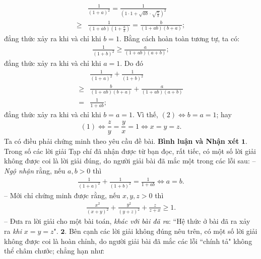 \begin{multicols}{2}
\begin{align*}
		&\frac{1}{{{{\left( {1 + a} \right)}^2}}} = \frac{1}{{{{\left( {1 \cdot 1 + \sqrt {ab}  \cdot \sqrt {\frac{a}{b}} } \right)}^2}}} \\[-0.4ex]
		\ge &\frac{1}{{\left( {1 + ab} \right)\left( {1 + \frac{a}{b}} \right)}}= \frac{b}{{\left( {1 + ab} \right)\left( {b + a} \right)}};
	\end{align*}
	đẳng thức xảy ra khi và chỉ khi $b = 1$.
	\vskip 0.05cm
	Bằng cách hoàn toàn tương tự, ta có:
	\begin{align*}
		\frac{1}{{{{\left( {1 + b} \right)}^2}}} \ge \frac{a}{{\left( {1 + ab} \right)\left( {a + b} \right)}};
	\end{align*}
	đẳng thức xảy ra khi và chỉ khi $a = 1$.
	\vskip 0.05cm
	Do đó
	\begin{align*}
		&\frac{1}{{{{\left( {1 + a} \right)}^2}}} + \frac{1}{{{{\left( {1 + b} \right)}^2}}} \\[-0.4ex]
		\ge &\frac{b}{{\left( {1 + ab} \right)\left( {b + a} \right)}} + \frac{a}{{\left( {1 + ab} \right)\left( {a + b} \right)}} \\[-0.4ex]
		= &\frac{1}{{1 + ab}};
	\end{align*}
	đẳng thức xảy ra khi và chỉ khi $b = a = 1$.
	\vskip 0.05cm
	Vì thế, $(2) \Leftrightarrow b = a = 1$; hay
	\begin{align*}
		(1)  \Leftrightarrow  \dfrac{z}{y} = \dfrac{y}{x} = 1  \Leftrightarrow  x = y = z.
	\end{align*}
	Ta có điều phải chứng minh theo yêu cầu đề bài.
	\vskip 0.05cm
	\textbf{\color{thachthuctoanhoc}Bình luận và Nhận xét}
	\vskip 0.05cm
	$\pmb{1.}$ Trong số các lời giải Tạp chí đã nhận được từ bạn đọc, rất tiếc, có một số lời giải không được coi là lời giải đúng, do người giải bài đã mắc một trong các lỗi sau:
	\vskip 0.05cm
	-- \textit{Ngộ nhận} rằng, nếu $a, b > 0$ thì
	\begin{align*}
		\frac{1}{{{{\left( {1 \!+\! a} \right)}^2}}} \!+\! \frac{1}{{{{\left( {1 \!+\! b} \right)}^2}}} \!=\! \frac{1}{{1 \!+\! ab}} \!\Leftrightarrow\! a \!=\!b.
	\end{align*}
	-- Mới chỉ chứng minh được rằng, nếu $x, y, z > 0$ thì
	\begin{align*}
		\frac{{{x^2}}}{{{{\left( {x + y} \right)}^2}}} + \frac{{{y^2}}}{{{{\left( {y + z} \right)}^2}}} + \frac{z}{{z + x}} \ge 1.
	\end{align*}
	-- Đưa ra lời giải cho một bài toán, \textit{khác với bài đã ra}: ``Hệ thức ở bài đã ra xảy ra \textit{khi} $x = y = z$".
	\vskip 0.05cm
	$\pmb{2.}$ Bên cạnh các lời giải không đúng nêu trên, có một số lời giải không được coi là hoàn chỉnh, do người giải bài đã mắc các lỗi ``chính tả" không thể châm chước; chẳng hạn như:

\end{multicols}
